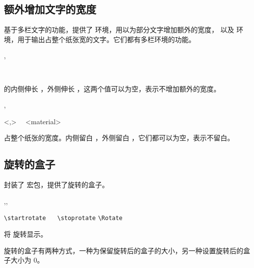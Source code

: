 \documentclass{whudoc}
\begin{document}
\subsection{额外增加文字的宽度}

基于多栏文字的功能，提供了  环境，用以为部分文字增加额外的宽度，
以及  环境，用于输出占整个纸张宽的文字。它们都有多栏环境的功能。

\begin{function}{\startextrawidth,\stopextrawidth}
  \begin{syntax}
    \V\startextrawidth {} 
    \V\startextrawidth {}  
    ~~
    \V\stopextrawidth
  \end{syntax}
 的内侧伸长 ，外侧伸长 ，这两个值可以为空，表示不增加额外的宽度。
\end{function}

\begin{function}{\startfullpagewidth,\stopfullpagewidth}
  \begin{syntax}
    \V\startfullpagewidth
    \V\startfullpagewidth {} \string<,\string>
    ~~<material>
    \V\stopfullpagewidth
  \end{syntax}
 占整个纸张的宽度。内侧留白 ，外侧留白 ，它们都可以为空，表示不留白。
\end{function}

\subsection{旋转的盒子}

\WhuTeX 封装了  宏包，提供了旋转的盒子。

\begin{function}{\startrotate,\stoprotate,\Rotate}
  \begin{syntax}
    \verb|\startrotate| 
    ~~
    \verb|\stoprotate|
    \endgraf \medskip 
    \verb|\Rotate|  
  \end{syntax}
将  旋转显示。
\end{function}

旋转的盒子有两种方式，一种为保留旋转后的盒子的大小，另一种设置旋转后的盒子大小为 0。
\end{document}
